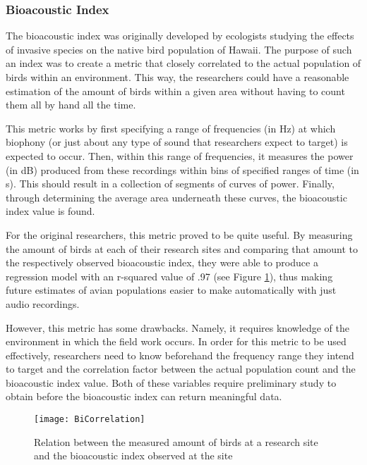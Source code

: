 \subsubsection{Bioacoustic Index}
The bioacoustic index was originally developed by ecologists studying the effects of invasive species on the native bird population of Hawaii. The purpose of such an index was to create a metric that closely correlated to the actual population of birds within an environment. This way, the researchers could have a reasonable estimation of the amount of birds within a given area without having to count them all by hand all the time.\par
This metric works by first specifying a range of frequencies (in Hz) at which biophony (or just about any type of sound that researchers expect to target) is expected to occur. Then, within this range of frequencies, it measures the power (in dB) produced from these recordings within bins of specified ranges of time (in s). This should result in a collection of segments of curves of power. Finally, through determining the average area underneath these curves, the bioacoustic index value is found.\par
For the original researchers, this metric proved to be quite useful. By measuring the amount of birds at each of their research sites and comparing that amount to the respectively observed bioacoustic index, they were able to produce a regression model with an r-squared value of .97 (see Figure \ref{fig:BiCorrelation}), thus making future estimates of avian populations easier to make automatically with just audio recordings.\cite{boelman}\par
However, this metric has some drawbacks. Namely, it requires knowledge of the environment in which the field work occurs. In order for this metric to be used effectively, researchers need to know beforehand the frequency range they intend to target and the correlation factor between the actual population count and the bioacoustic index value. Both of these variables require preliminary study to obtain before the bioacoustic index can return meaningful data.\par
\begin{figure}
  \begin{center}
    \texttt{[image: BiCorrelation]}
  \end{center}
  \caption{Relation between the measured amount of birds at a research site and the bioacoustic index observed at the site}
  \label{fig:BiCorrelation}
\end{figure}
